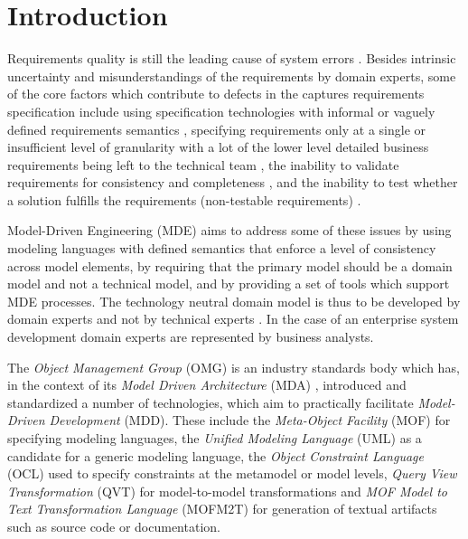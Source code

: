\section{Introduction}

Requirements quality is still the leading cause of system errors \cite{heck_experiences_2008}. Besides intrinsic uncertainty and misunderstandings of the requirements by domain experts, some of the core factors which contribute to defects in the captures requirements specification include using specification technologies with informal or vaguely defined requirements semantics \cite{ferguson_empirical_2006}, specifying requirements only at a single or insufficient level of granularity with a lot of the lower level detailed business requirements being left to the technical team
\cite{espana_evaluating_2009,getBetterReference}, the inability to validate requirements for consistency and completeness \cite{somebodyPleaseFindASuitableReference}, and the inability to test whether a solution fulfills the requirements (non-testable requirements) \cite{bashardoust-tajali_extracting_2008}.

Model-Driven Engineering (MDE) aims to address some of these issues by using modeling languages with defined semantics that enforce a level of consistency across model elements, by requiring that the primary model should be a domain model and not a technical model\cite{asnina_computation_2010}, and by providing a set of tools which support MDE processes. The technology neutral domain model is thus to be developed by domain experts and not by technical experts \cite{asnina_computation_2010}. In the case of an enterprise system development domain experts are represented by business analysts.

The {\em Object Management Group} (OMG) is an industry standards body which has, in the context of its {\em Model Driven Architecture} (MDA) \cite{siegel_developing_2001}, introduced and standardized a number of technologies, which aim to practically facilitate {\em Model-Driven Development} (MDD). These include the {\em Meta-Object Facility} (MOF) for specifying modeling languages, the {\em Unified Modeling Language} (UML) as a candidate for a generic modeling language, the {\em Object Constraint Language} (OCL) used to specify constraints at the metamodel or model levels, {\em Query View Transformation} (QVT) for model-to-model transformations and {\em MOF Model to Text Transformation Language} (MOFM2T) for generation of textual artifacts such as source code or documentation. 

